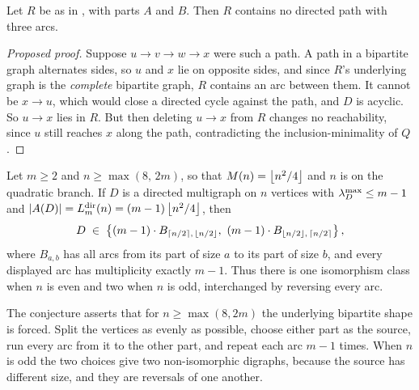 \begin{conjecture}\label{lem:skeleton-shallow}
Let $R$ be as in , with parts $A$ and $B$. Then $R$ contains no directed path with three arcs.
\end{conjecture}

\begin{proof}[Proposed proof]
Suppose $u \to v \to w \to x$ were such a path. A path in a bipartite graph alternates sides, so $u$ and $x$ lie on opposite sides, and since $R$'s underlying graph is the \emph{complete} bipartite graph, $R$ contains an arc between them. It cannot be $x \to u$, which would close a directed cycle against the path, and $D$ is acyclic. So $u \to x$ lies in $R$. But then deleting $u \to x$ from $R$ changes no reachability, since $u$ still reaches $x$ along the path, contradicting the inclusion-minimality of $Q$.
\end{proof}

\begin{conjecture}\label{thm:dir-multi-uniqueness}
Let $m \ge 2$ and $n \ge \max(8,\, 2m)$, so that $M(n) = \left\lfloor n^2/4 \right\rfloor$ and $n$ is on the quadratic branch. If $D$ is a directed multigraph on $n$ vertices with $\lambda^{\max}_D \le m-1$ and $|A(D)| = L_m^{\mathrm{dir}}(n) = (m-1)\left\lfloor n^2/4 \right\rfloor$, then
\[
    D \;\in\; \left\{(m-1) \cdot B_{\left\lceil n/2 \right\rceil,\,\left\lfloor n/2 \right\rfloor},\ (m-1) \cdot B_{\left\lfloor n/2 \right\rfloor,\,\left\lceil n/2 \right\rceil}\right\} ,
\]
where $B_{a,b}$ has all arcs from its part of size $a$ to its part of size $b$, and every displayed arc has multiplicity exactly $m-1$. Thus there is one isomorphism class when $n$ is even and two when $n$ is odd, interchanged by reversing every arc.
\end{conjecture}

The conjecture asserts that for $n\ge\max(8,2m)$ the underlying bipartite shape is forced. Split the vertices as evenly as possible, choose either part as the source, run every arc from it to the other part, and repeat each arc $m-1$ times. When $n$ is odd the two choices give two non-isomorphic digraphs, because the source has different size, and they are reversals of one another.


